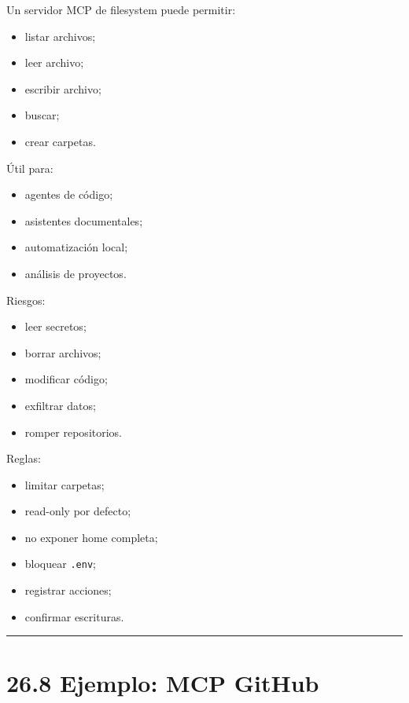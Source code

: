 Un servidor MCP de filesystem puede permitir:

\begin{itemize}
\tightlist
\item
  listar archivos;
\item
  leer archivo;
\item
  escribir archivo;
\item
  buscar;
\item
  crear carpetas.
\end{itemize}

Útil para:

\begin{itemize}
\tightlist
\item
  agentes de código;
\item
  asistentes documentales;
\item
  automatización local;
\item
  análisis de proyectos.
\end{itemize}

Riesgos:

\begin{itemize}
\tightlist
\item
  leer secretos;
\item
  borrar archivos;
\item
  modificar código;
\item
  exfiltrar datos;
\item
  romper repositorios.
\end{itemize}

Reglas:

\begin{itemize}
\tightlist
\item
  limitar carpetas;
\item
  read-only por defecto;
\item
  no exponer home completa;
\item
  bloquear \passthrough{\lstinline!.env!};
\item
  registrar acciones;
\item
  confirmar escrituras.
\end{itemize}

\begin{center}\rule{0.5\linewidth}{0.5pt}\end{center}

\section{26.8 Ejemplo: MCP GitHub}\label{ejemplo-mcp-github}

